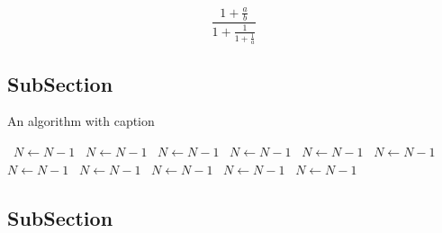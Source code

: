 \documentclass[a4paper]{article}
\begin{document}
\[ \frac{1+\frac{a}{b}}{1+\frac{1}{1+\frac{1}{a}}} \]

\subsection{SubSection}

\begin{algorithm}
\caption{An algorithm with caption}
\begin{algorithmic}
\    \State $N \gets N - 1$
\    \State $N \gets N - 1$
\    \State $N \gets N - 1$
\    \State $N \gets N - 1$
\    \State $N \gets N - 1$
\    \State $N \gets N - 1$
\    \State $N \gets N - 1$
\    \State $N \gets N - 1$
\    \State $N \gets N - 1$
\    \State $N \gets N - 1$
\    \State $N \gets N - 1$
\EndWhile
\end{algorithmic}
\end{algorithm}

\subsection{SubSection}
\end{document}
